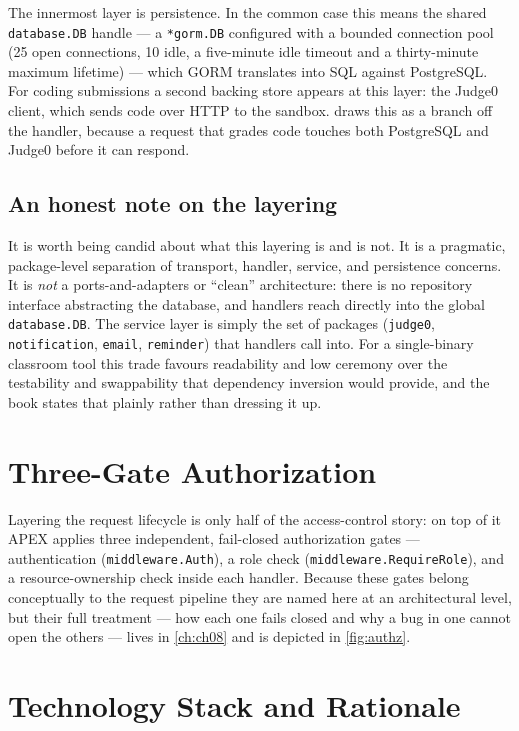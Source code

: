 The innermost layer is persistence. In the common case this means the shared
\texttt{database.DB} handle --- a \texttt{*gorm.DB} configured with a bounded
connection pool (25 open connections, 10 idle, a five-minute idle timeout and a
thirty-minute maximum lifetime) --- which GORM translates into SQL against
PostgreSQL. For coding submissions a second backing store appears at this layer:
the Judge0 client, which sends code over HTTP to the sandbox. 
draws this as a branch off the handler, because a request that grades code
touches both PostgreSQL and Judge0 before it can respond.

\subsection{An honest note on the layering}

It is worth being candid about what this layering is and is not. It is a
pragmatic, package-level separation of transport, handler, service, and
persistence concerns. It is \emph{not} a ports-and-adapters or ``clean''
architecture: there is no repository interface abstracting the database, and
handlers reach directly into the global \texttt{database.DB}. The service layer
is simply the set of packages (\texttt{judge0}, \texttt{notification},
\texttt{email}, \texttt{reminder}) that handlers call into. For a single-binary
classroom tool this trade favours readability and low ceremony over the
testability and swappability that dependency inversion would provide, and the
book states that plainly rather than dressing it up.

\section{Three-Gate Authorization}

Layering the request lifecycle is only half of the access-control story: on top
of it APEX applies three independent, fail-closed authorization gates ---
authentication (\texttt{middleware.Auth}), a role check
(\texttt{middleware.RequireRole}), and a resource-ownership check inside each
handler. Because these gates belong conceptually to the request pipeline they
are named here at an architectural level, but their full treatment --- how each
one fails closed and why a bug in one cannot open the others --- lives in
\cref{ch:ch08} and is depicted in \cref{fig:authz}.

\section{Technology Stack and Rationale}\label{sec:stack}

